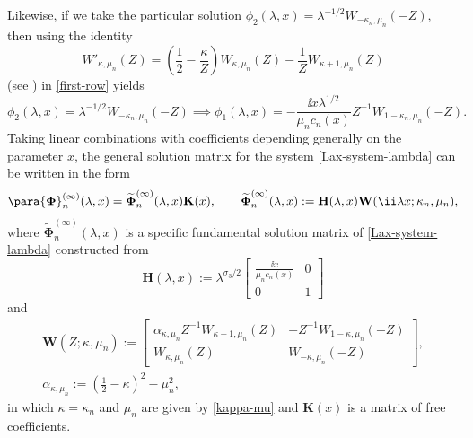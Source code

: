 Likewise, if we take the particular solution $\phi_2(\lambda,x)=\lambda^{-1/2}W_{-\kappa_n,\mu_n}(-Z)$, then using the identity
\begin{equation*}
 W'_{\kappa, \mu_n}(Z) = \left( \dfrac{1}{2} - \dfrac{\kappa}{Z} \right)W_{\kappa, \mu_n}(Z) - \dfrac{1}{Z} W_{\kappa+1, \mu_n}(Z)
\end{equation*}
(see \cite[equation~(13.15.26)]{DLMF}) in \eqref{first-row} yields
\begin{equation*}
 \phi_2(\lambda,x)=\lambda^{-1/2}W_{-\kappa_n,\mu_n}(-Z)\implies \phi_1(\lambda,x)=-\frac{\ii x\lambda^{1/2}}{\mu_n c_n(x)}Z^{-1}W_{1-\kappa_n,\mu_n}(-Z).
\end{equation*}
Taking linear combinations with coefficients depending generally on the parameter $x$, the general solution matrix for the system \eqref{Lax-system-lambda} can be written in the form
\begin{equation}
 \para{\boldsymbol\Phi}_n^{(\infty)}(\lambda,x)=\widetilde{\boldsymbol\Phi}^{(\infty)}_n(\lambda,x)\mathbf{K}(x),\qquad\widetilde{\boldsymbol\Phi}_n^{(\infty)}(\lambda,x):=\mathbf{H}(\lambda,x)\mathbf{W}(\ii\lambda x;\kappa_n,\mu_n),
 \label{Psi0-define}
\end{equation}
where $\widetilde{\mathbf{\Phi}}_n^{(\infty)}(\lambda,x)$ is a specific fundamental solution matrix of \eqref{Lax-system-lambda} constructed from
\begin{equation}
 \mathbf{H}(\lambda,x):=\lambda^{\sigma_3/2}\begin{bmatrix}\displaystyle\frac{\ii x}{\mu_n c_n(x)} & 0\\0 & 1\end{bmatrix}
 \label{H-define}
\end{equation}
and
\begin{gather}
 \mathbf{W}(Z;\kappa,\mu_n):=
 \begin{bmatrix}
 \alpha_{\kappa,\mu_n}Z^{-1}W_{\kappa-1,\mu_n}(Z) & -Z^{-1}W_{1-\kappa,\mu_n}(-Z)\\
 W_{\kappa,\mu_n}(Z) & W_{-\kappa,\mu_n}(-Z)
 \end{bmatrix},\nonumber\\ \alpha_{\kappa,\mu_n}:=\left(\frac{1}{2}-\kappa\right)^2-\mu_n^2,
 \label{M-alpha-define}
\end{gather}
in which $\kappa=\kappa_n$ and $\mu_n$ are given by \eqref{kappa-mu} and $\mathbf{K}(x)$ is a matrix of free coefficients.

